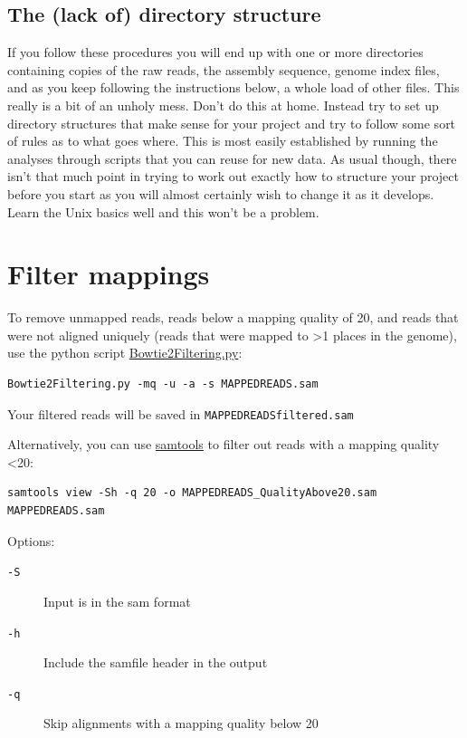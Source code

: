 \documentclass[11pt]{article}
\begin{document}
\subsection{The (lack of) directory structure}
\label{sec:orgheadline3}
If you follow these procedures you will end up with one or more directories containing
copies of the raw reads, the assembly sequence, genome index files, and as you keep following the
instructions below, a whole load of other files. This really is a bit of an unholy
mess. Don't do this at home. Instead try to set up directory structures that
make sense for your project and try to follow some sort of rules as to what
goes where. This is most easily established by running the analyses through scripts
that you can reuse for new data. As usual though, there isn't that much point
in trying to work out exactly how to structure your project before you start
as you will almost certainly wish to change it as it develops. Learn the
Unix basics well and this won't be a problem.

\section{Filter mappings}
\label{sec:orgheadline7}
To remove unmapped reads, reads below a mapping quality of 20, and
reads that were not aligned uniquely (reads that were mapped to >1
places in the genome), use the python script \href{http://marinetics.org/2015/03/03/Bowtie2Filtering.html}{Bowtie2Filtering.py}:

\begin{verbatim}
Bowtie2Filtering.py -mq -u -a -s MAPPEDREADS.sam
\end{verbatim}

Your filtered reads will be saved in \texttt{MAPPEDREADSfiltered.sam}

Alternatively, you can 
use \href{http://samtools.sourceforge.net/samtools.shtml#mpileup}{samtools} to filter out reads with a mapping quality <20:

\begin{verbatim}
samtools view -Sh -q 20 -o MAPPEDREADS_QualityAbove20.sam MAPPEDREADS.sam
\end{verbatim}

Options:

\begin{description}
\item[{\texttt{-S}}] Input is in the sam format
\item[{\texttt{-h}}] Include the samfile header in the output
\item[{\texttt{-q}}] Skip alignments with a mapping quality below 20
\end{description}
\end{document}
